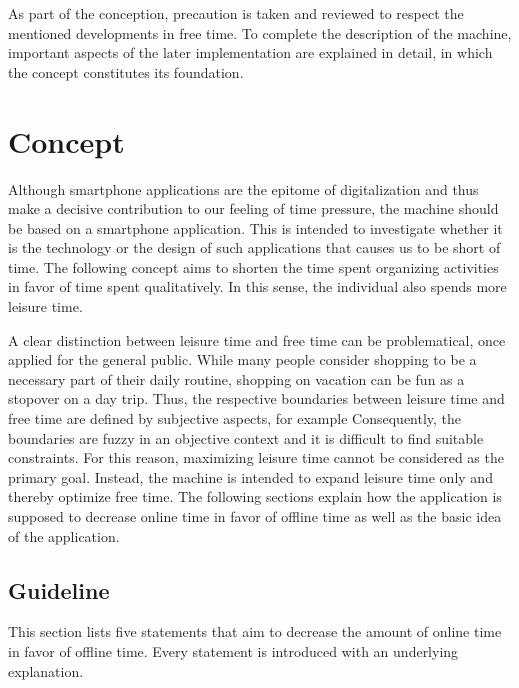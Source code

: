 \documentclass[12pt,numbers=noenddot,parskip,bibliography=totocnumbered,listof=totocnumbered,draft]{scrreprt}
\begin{document}
As part of the conception, precaution is taken and reviewed to respect the mentioned developments in free time. To complete the description of the machine, important aspects of the later implementation are explained in detail, in which the concept constitutes its foundation.

\section{Concept}
Although smartphone applications are the epitome of digitalization and thus make a decisive contribution to our feeling of time pressure, the machine should be based on a smartphone application. This is intended to investigate whether it is the technology or the design of such applications that causes us to be short of time. The following concept aims to shorten the time spent organizing activities in favor of time spent qualitatively. In this sense, the individual also spends more leisure time. 

A clear distinction between leisure time and free time can be problematical, once applied for the general public. While many people consider shopping to be a necessary part of their daily routine, shopping on vacation can be fun as a stopover on a day trip. Thus, the respective boundaries between leisure time and free time are defined by subjective aspects, for example  Consequently, the boundaries are fuzzy in an objective context and it is difficult to find suitable constraints. For this reason, maximizing leisure time cannot be considered as the primary goal. Instead, the machine is intended to expand leisure time only and thereby optimize free time. The following sections explain how the application is supposed to decrease online time in favor of offline time as well as the basic idea of the application.

\subsection{Guideline}
This section lists five statements that aim to decrease the amount of online time in favor of offline time. Every statement is introduced with an underlying explanation.
\end{document}
